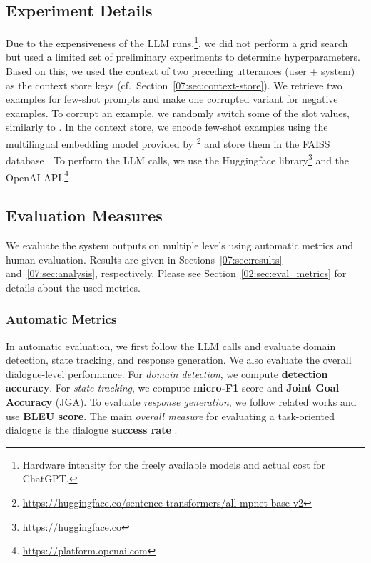 \subsection{Experiment Details}
\label{subsec:exp-details}
Due to the expensiveness of the LLM runs,\footnote{Hardware intensity for the freely available models and actual cost for ChatGPT.}, we did not perform a grid search but used a limited set of preliminary experiments to determine hyperparameters.
Based on this, we used the context of two preceding utterances (user + system) as the context store keys (cf.~Section~\ref{07:sec:context-store}).
We retrieve two examples for few-shot prompts and make one corrupted variant for negative examples.
To corrupt an example, we randomly switch some of the slot values, similarly to \citet{kulhanek-etal-2021-augpt}.
In the context store, we encode few-shot examples using the multilingual embedding model provided by \citet{reimers-2020-multilingual-sentence-bert}\footnote{\url{https://huggingface.co/sentence-transformers/all-mpnet-base-v2}} and store them in the FAISS database \cite{johnson2019billion}.
To perform the LLM calls, we use the Huggingface library\footnote{\url{https://huggingface.co}} and the OpenAI API.\footnote{\url{https://platform.openai.com}}

\subsection{Evaluation Measures}

We evaluate the system outputs on multiple levels using automatic metrics and human evaluation. Results are given in Sections~\ref{07:sec:results} and~\ref{07:sec:analysis}, respectively.
Please see Section~\ref{02:sec:eval_metrics} for details about the used metrics.
\subsubsection*{Automatic Metrics}
In automatic evaluation, we first follow the LLM calls and evaluate domain detection, state tracking, and response generation. We also evaluate the overall dialogue-level performance.
For \emph{domain detection}, we compute \textbf{detection accuracy}.
For \emph{state tracking}, we compute \textbf{micro-F1} score and \textbf{Joint Goal Accuracy} (JGA).
To evaluate \emph{response generation}, we follow related works and use \textbf{BLEU score}.
The main \emph{overall measure} for evaluating a task-oriented dialogue is the dialogue \textbf{success rate} \cite{deriu_survey_2021}.

